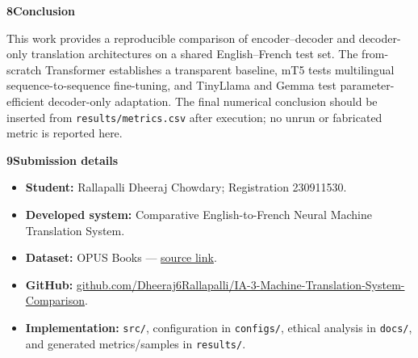 \documentclass[10pt]{article}
\newcommand{\sectiontitle}[1]{\par\vspace{5pt}\textbf{\large #1}\vspace{2pt}\par}
\begin{document}
\sectiontitle{8\quad Conclusion}
This work provides a reproducible comparison of encoder--decoder and decoder-only translation
architectures on a shared English--French test set. The from-scratch Transformer establishes a
transparent baseline, mT5 tests multilingual sequence-to-sequence fine-tuning, and TinyLlama
and Gemma test parameter-efficient decoder-only adaptation. The final numerical conclusion
should be inserted from \texttt{results/metrics.csv} after execution; no unrun or fabricated
metric is reported here.

\sectiontitle{9\quad Submission details}
\begin{itemize}
\item \textbf{Student:} Rallapalli Dheeraj Chowdary; Registration 230911530.
\item \textbf{Developed system:} Comparative English-to-French Neural Machine Translation System.
\item \textbf{Dataset:} OPUS Books --- \href{https://opus.nlpl.eu/legacy/opus-books.php}{source link}.
\item \textbf{GitHub:} \href{https://github.com/Dheeraj6Rallapalli/IA-3-Machine-Translation-System-Comparison}{github.com/Dheeraj6Rallapalli/IA-3-Machine-Translation-System-Comparison}.
\item \textbf{Implementation:} \texttt{src/}, configuration in \texttt{configs/}, ethical analysis
in \texttt{docs/}, and generated metrics/samples in \texttt{results/}.
\end{itemize}
\end{document}
